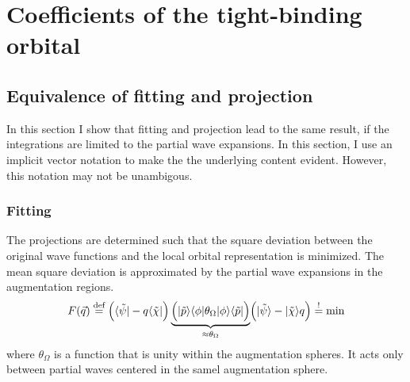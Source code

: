 \documentclass[11pt,a4paper]{report}
\begin{document}
\section{Coefficients of the tight-binding orbital}


\subsection{Equivalence of fitting and projection}
In this section I show that fitting and projection lead to the same
result, if the integrations are limited to the partial wave
expansions. In this section, I use an implicit vector notation to make
the the underlying content evident. However, this notation may not be
unambigous.


\subsubsection{Fitting}
The projections are determined such that the square deviation between
the original wave functions and the local orbital representation is
minimized. The mean square deviation is approximated by the partial
wave expansions in the augmentation regions.
\begin{eqnarray}
F(\vec{q})\stackrel{\text{def}}{=} \Bigl(\langle\tilde{\psi}|-q\langle\tilde{\chi}|\Bigr)
\underbrace{
\Bigl(|\tilde{p}\rangle\langle\phi|\theta_\Omega|\phi\rangle\langle\tilde{p}|\Bigr)
}_{\approx\theta_\Omega}
\Bigl(|\tilde{\psi}\rangle-|\tilde{\chi}\rangle q\Bigr)\stackrel{!}{=}\text{min}
\end{eqnarray}
where $\theta_\Omega$ is a function that is unity within the
augmentation spheres. It acts only between partial waves centered in
the samel augmentation sphere.
\end{document}
